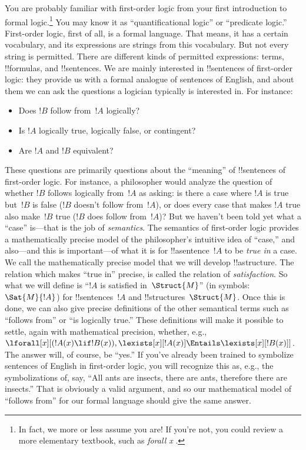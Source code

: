 \documentclass[../../../include/open-logic-section]{subfiles}
\begin{document}


You are probably familiar with first-order logic from your first
introduction to formal logic.\footnote{In fact, we more or less assume
you are!{} If you're not, you could review a more elementary textbook,
such as \emph{forall x} \citep{Magnus2021}.} You may know it as
``quantificational logic'' or ``predicate logic.''  First-order
logic, first of all, is a formal language.  That means, it has a
certain vocabulary, and its expressions are strings from this
vocabulary.  But not every string is permitted.  There are different
kinds of permitted expressions: terms, !!{formula}s, and
!!{sentence}s.  We are mainly interested in !!{sentence}s of
first-order logic: they provide us with a formal analogue of sentences
of English, and about them we can ask the questions a logician
typically is interested in. For instance: 
\begin{itemize}
    \item Does $!B$ follow from~$!A$ logically?
    \item Is $!A$ logically true, logically false, or
contingent?
    \item Are $!A$ and $!B$ equivalent?
\end{itemize}

These questions are primarily questions about the ``meaning'' of
!!{sentence}s of first-order logic.  For instance, a philosopher would
analyze the question of whether $!B$ follows logically from~$!A$ as
asking: is there a case where $!A$ is true but~$!B$ is false ($!B$
doesn't follow from~$!A$), or does every case that makes $!A$ true
also make~$!B$ true ($!B$ does follow from~$!A$)?  But we haven't been
told yet what a ``case'' is---that is the job of \emph{semantics}.  The
semantics of first-order logic provides a mathematically precise model
of the philosopher's intuitive idea of ``case,'' and also---and this
is important---of what it is for !!a{sentence}~$!A$ to be \emph{true
in} a case. We call the mathematically precise model that we will
develop !!a{structure}. The relation which makes ``true in'' precise,
is called the relation of \emph{satisfaction}.  So what we will define
is ``$!A$ is satisfied in~$\Struct{M}$'' (in symbols: $\Sat{M}{!A}$)
for !!{sentence}s~$!A$ and !!{structure}s~$\Struct{M}$. Once this is
done, we can also give precise definitions of the other semantical
terms such as ``follows from'' or ``is logically true.'' These
definitions will make it possible to settle, again with mathematical
precision, whether, e.g., $\lforall[x][(!A(x) \lif !B(x)),
\lexists[x][!A(x)] \Entails \lexists[x][!B(x)]]$. The answer will, of
course, be ``yes.'' If you've already been trained to symbolize
sentences of English in first-order logic, you will recognize this as,
e.g., the symbolizations of, say, ``All ants are insects, there are
ants, therefore there are insects.'' That is obviously a valid
argument, and so our mathematical model of ``follows from'' for our
formal language should give the same answer.
\end{document}
